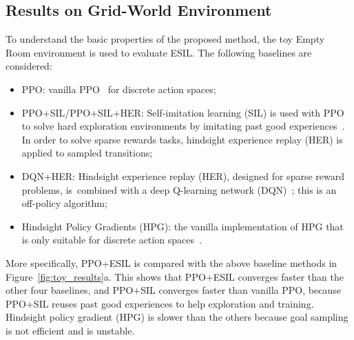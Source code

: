 \subsection{Results on Grid-World Environment}
To understand the basic properties of the proposed method, the toy Empty Room environment is used to evaluate ESIL.
The following baselines are considered:
\begin{itemize}
    \item PPO: vanilla PPO~\cite{schulman2017proximal} for discrete action spaces;
    \item PPO+SIL/PPO+SIL+HER: Self-imitation learning (SIL) is used with PPO to solve hard exploration environments by imitating past good experiences~\cite{oh2018self}. In order to solve sparse rewards tasks, hindsight experience replay (HER) is applied to sampled transitions;
    \item DQN+HER: Hindsight experience replay (HER), designed for sparse reward problems, is~combined with a deep Q-learning network (DQN)~\cite{andrychowicz2017hindsight}; this is an off-policy algorithm;
    \item Hindsight Policy Gradients (HPG): the vanilla implementation of HPG that is only suitable for discrete action spaces~\cite{rauber2018hindsight}.
\end{itemize}
More specifically, {PPO+ESIL is compared with the above baseline methods} in Figure~\ref{fig:toy_results}a. This shows that PPO+ESIL converges faster than the other four baselines, and PPO+SIL converges faster than vanilla PPO, because PPO+SIL reuses past good experiences to help exploration and training. Hindsight policy gradient (HPG) is slower than the others because goal sampling is not efficient and is unstable. 

